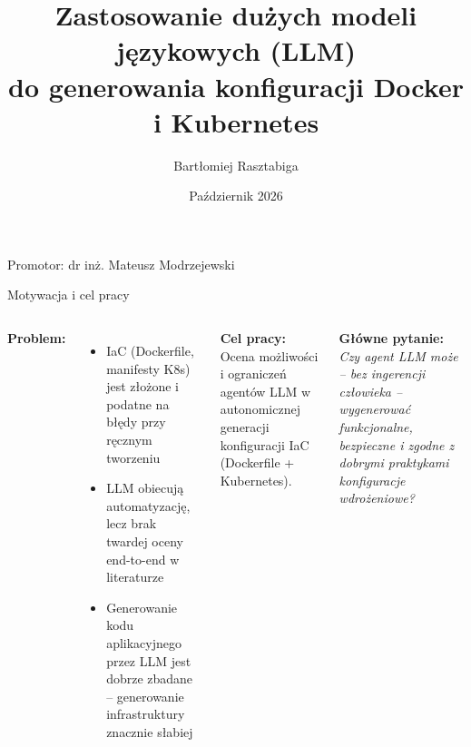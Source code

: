 \documentclass[aspectratio=169]{beamer}
\title{Zastosowanie dużych modeli językowych (LLM)\\do generowania konfiguracji Docker i Kubernetes}
\author{Bartłomiej Rasztabiga}
\institute{Instytut Automatyki i Informatyki Stosowanej\\Politechnika Warszawska}
\date{Październik 2026}
\newcommand{\supervisor}{Promotor: dr inż. Mateusz Modrzejewski}
\begin{document}
\begin{frame}[plain]
    \titlepage
    \vspace{-1.5em}
    \centering
    \supervisor
\end{frame}

\begin{frame}{Motywacja i cel pracy}
    \begin{columns}[T]
        \textbf{Problem:}
        \begin{itemize}
            \item IaC (Dockerfile, manifesty K8s) jest złożone i podatne na błędy przy ręcznym tworzeniu
            \item LLM obiecują automatyzację, lecz brak twardej oceny end-to-end w literaturze
            \item Generowanie kodu aplikacyjnego przez LLM jest dobrze zbadane -- generowanie infrastruktury znacznie słabiej
        \end{itemize}
        \textbf{Cel pracy:}\\
        Ocena możliwości i ograniczeń agentów LLM w autonomicznej generacji konfiguracji IaC (Dockerfile + Kubernetes).
        \vspace{1em}

        \textbf{Główne pytanie:}\\
        \textit{Czy agent LLM może -- bez ingerencji człowieka -- wygenerować funkcjonalne, bezpieczne i zgodne z dobrymi praktykami konfiguracje wdrożeniowe?}
    \end{columns}
\end{frame}
\end{document}
